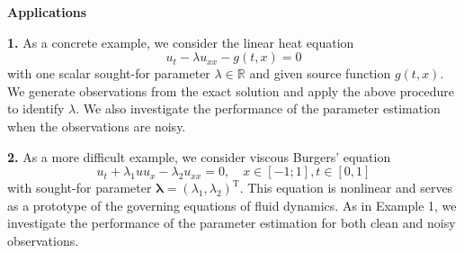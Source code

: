 \documentclass[a4paper, 12pt, parskip]{scrartcl}
\newcommand{\T}{\ensuremath{\text{T}}}
\renewcommand{\vec}[1]{\boldsymbol{#1}}
\newcommand{\VLambda}{\ensuremath{\vec{\lambda}}}
\newcommand{\R}{\mathbb R}
\begin{document}
\textbf{Applications}

\textbf{1.} As a concrete example, we consider the linear heat equation
\begin{equation}
    u_t - \lambda u_{xx} - g(t, x) = 0
\end{equation}
with one scalar sought-for parameter \(\lambda\in \R\) and given source function
\(g(t, x)\).
We generate observations from the exact solution and apply the above procedure
to identify $\lambda$. We also investigate
the performance of the parameter estimation when the observations are noisy.

\textbf{2.} As a more difficult example, we consider viscous Burgers’ equation    
\begin{equation}
    u_t + \lambda_1 u u_x - \lambda_2 u_{xx} = 0, \quad x\in[-1; 1], t\in[0, 1]
\end{equation}
with sought-for parameter \( \VLambda = \left( \lambda_1, \lambda_2 \right)^\T \).
This equation is nonlinear and serves as a prototype of the governing
equations of fluid dynamics. As in Example 1, we investigate the performance
of the parameter estimation for both clean and noisy observations.



\end{document}
